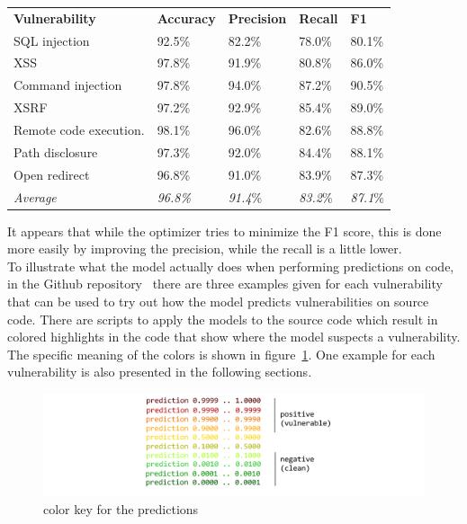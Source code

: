 \documentclass[
a4paper,
pagesize,
pdftex,
12pt,
twoside, %
BCOR=5mm, %
ngerman,
fleqn,
final,
]{scrartcl}
\begin{document}
	\begin{tabular}{ | p{5cm} || p{2cm}|p{2cm}|p{2cm}|p{2cm}|  }
		\hline
		\textbf{Vulnerability} & \textbf{Accuracy} & \textbf{Precision} & \textbf{Recall} & \textbf{F1} \\
		SQL injection & 92.5\% & 82.2\% & 78.0\% & 80.1\%\\
		XSS & 97.8\% & 91.9\% & 80.8\% & 86.0\% \\
		Command injection & 97.8\% & 94.0\% & 87.2\% & 90.5\% \\
		XSRF & 97.2\% & 92.9\% & 85.4\% & 89.0\%\\
		Remote code execution.  & 98.1\% & 96.0\%& 82.6\%& 88.8\%\\
		Path disclosure & 97.3\% & 92.0\% & 84.4\% & 88.1\%\\
		Open redirect & 96.8\% & 91.0\% & 83.9\% & 87.3\% \\
		\hline
		\textit{Average} & \textit{96.8\%} & \textit{91.4}\% & \textit{83.2}\% & \textit{87.1}\%\\
		\hline
		\hline
	\end{tabular}
	
	It appears that while the optimizer tries to minimize the F1 score, this is done more easily by improving the precision, while the recall is a little lower.\\	
	To illustrate what the model actually does when performing predictions on code, in the Github repository~\cite{Wartschinski.2.12.2019} there are three examples given for each vulnerability that can be used to try out how the model predicts vulnerabilities on source code. There are scripts to apply the models to the source code which result in colored highlights in the code that show where the model suspects a vulnerability. The specific meaning of the colors is shown in figure~\ref{fig:legende}. One example for each vulnerability is also presented in the following sections. 
	 
	 	
	 \begin{figure}[H]
	 	\centering
	 	\includegraphics[width=\linewidth]{img/colorkeysimple}
	 	\caption{color key for the predictions}
	 	\label{fig:legende}
	 \end{figure}
	 
\end{document}
